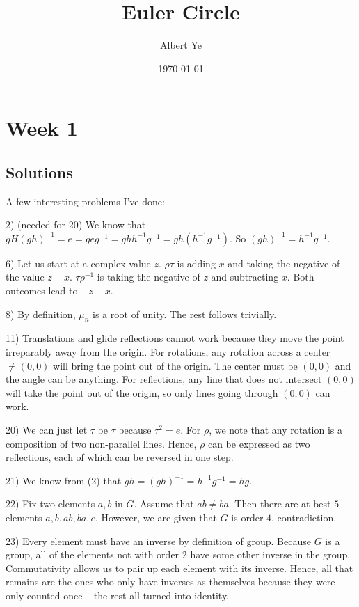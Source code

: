 \documentclass{scrartcl}
\title{Euler Circle}
\author{Albert Ye}
\date{\today}
\begin{document}
\maketitle

\section{Week 1}
\subsection{Solutions}
A few interesting problems I've done:

2) (needed for 20) We know that $gH(gh)^{-1} = e = geg^{-1} = ghh^{-1}g^{-1} = gh(h^{-1}g^{-1})$. So $(gh)^{-1} = h^{-1}g^{-1}$. \blackqed

6) Let us start at a complex value $z$. $\rho \tau$ is adding $x$ and taking the negative of the value $z+x$. $\tau \rho^{-1}$ is taking the negative of $z$ and subtracting $x$. Both outcomes lead to $-z-x$. \blackqed

8) By definition, $\mu_n$ is a root of unity. The rest follows trivially. \blackqed

11) Translations and glide reflections cannot work because they move the point irreparably away from the origin. For rotations, any rotation across a center $\ne (0, 0)$ will bring the point out of the origin. The center must be $(0,0)$ and the angle can be anything. For reflections, any line that does not intersect $(0,0)$ will take the point out of the origin, so only lines going through $(0,0)$ can work.

20) We can just let $\tau$ be $\tau$ because $\tau^2 = e$. For $\rho$, we note that any rotation is a composition of two non-parallel lines. Hence, $\rho$ can be expressed as two reflections, each of which can be reversed in one step. \blackqed 

21) We know from (2) that $gh = (gh)^{-1} = h^{-1}g^{-1} = hg$. \blackqed 

22) Fix two elements $a,b$ in $G$. Assume that $ab \ne ba$. Then there are at best $5$ elements $a,b,ab,ba,e$. However, we are given that $G$ is order $4$, contradiction. \blackqed

23) Every element must have an inverse by definition of group. Because $G$ is a group, all of the elements not with order $2$ have some other inverse in the group. Commutativity allows us to pair up each element with its inverse. Hence, all that remains are the ones who only have inverses as themselves because they were only counted once -- the rest all turned into identity. 
\end{document}
